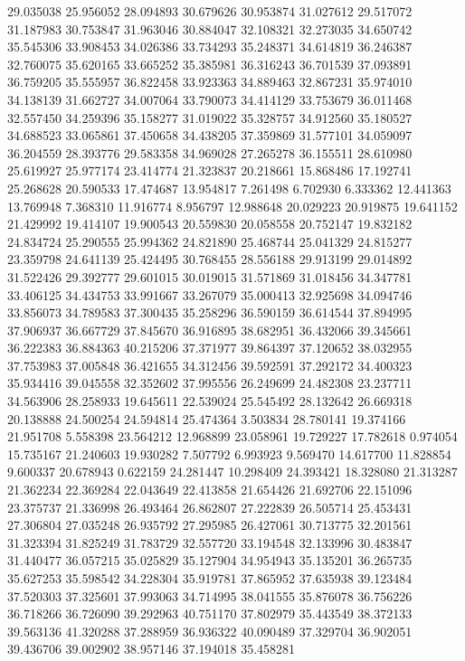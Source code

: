 29.035038
25.956052
28.094893
30.679626
30.953874
31.027612
29.517072
31.187983
30.753847
31.963046
30.884047
32.108321
32.273035
34.650742
35.545306
33.908453
34.026386
33.734293
35.248371
34.614819
36.246387
32.760075
35.620165
33.665252
35.385981
36.316243
36.701539
37.093891
36.759205
35.555957
36.822458
33.923363
34.889463
32.867231
35.974010
34.138139
31.662727
34.007064
33.790073
34.414129
33.753679
36.011468
32.557450
34.259396
35.158277
31.019022
35.328757
34.912560
35.180527
34.688523
33.065861
37.450658
34.438205
37.359869
31.577101
34.059097
36.204559
28.393776
29.583358
34.969028
27.265278
36.155511
28.610980
25.619927
25.977174
23.414774
21.323837
20.218661
15.868486
17.192741
25.268628
20.590533
17.474687
13.954817
7.261498
6.702930
6.333362
12.441363
13.769948
7.368310
11.916774
8.956797
12.988648
20.029223
20.919875
19.641152
21.429992
19.414107
19.900543
20.559830
20.058558
20.752147
19.832182
24.834724
25.290555
25.994362
24.821890
25.468744
25.041329
24.815277
23.359798
24.641139
25.424495
30.768455
28.556188
29.913199
29.014892
31.522426
29.392777
29.601015
30.019015
31.571869
31.018456
34.347781
33.406125
34.434753
33.991667
33.267079
35.000413
32.925698
34.094746
33.856073
34.789583
37.300435
35.258296
36.590159
36.614544
37.894995
37.906937
36.667729
37.845670
36.916895
38.682951
36.432066
39.345661
36.222383
36.884363
40.215206
37.371977
39.864397
37.120652
38.032955
37.753983
37.005848
36.421655
34.312456
39.592591
37.292172
34.400323
35.934416
39.045558
32.352602
37.995556
26.249699
24.482308
23.237711
34.563906
28.258933
19.645611
22.539024
25.545492
28.132642
26.669318
20.138888
24.500254
24.594814
25.474364
3.503834
28.780141
19.374166
21.951708
5.558398
23.564212
12.968899
23.058961
19.729227
17.782618
0.974054
15.735167
21.240603
19.930282
7.507792
6.993923
9.569470
14.617700
11.828854
9.600337
20.678943
0.622159
24.281447
10.298409
24.393421
18.328080
21.313287
21.362234
22.369284
22.043649
22.413858
21.654426
21.692706
22.151096
23.375737
21.336998
26.493464
26.862807
27.222839
26.505714
25.453431
27.306804
27.035248
26.935792
27.295985
26.427061
30.713775
32.201561
31.323394
31.825249
31.783729
32.557720
33.194548
32.133996
30.483847
31.440477
36.057215
35.025829
35.127904
34.954943
35.135201
36.265735
35.627253
35.598542
34.228304
35.919781
37.865952
37.635938
39.123484
37.520303
37.325601
37.993063
34.714995
38.041555
35.876078
36.756226
36.718266
36.726090
39.292963
40.751170
37.802979
35.443549
38.372133
39.563136
41.320288
37.288959
36.936322
40.090489
37.329704
36.902051
39.436706
39.002902
38.957146
37.194018
35.458281
